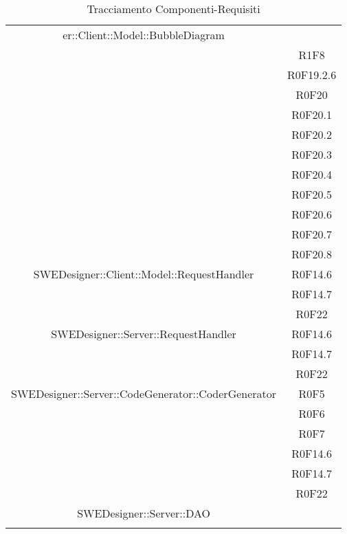 \documentclass[../SpecificaTecnica.tex]{subfiles}
\begin{document}
\begin{longtable}{|c|c|}
er::Client::Model::BubbleDiagram & \\&R1F8\\&R0F19.2.6\\&R0F20\\&R0F20.1\\&R0F20.2\\&R0F20.3\\&R0F20.4\\&R0F20.5\\&R0F20.6\\&R0F20.7\\&R0F20.8
		\\\hline
		
		SWEDesigner::Client::Model::RequestHandler & R0F14.6\\&R0F14.7\\&R0F22
		\\\hline
		
		SWEDesigner::Server::RequestHandler &  R0F14.6\\&R0F14.7\\&R0F22
		\\\hline
		
		SWEDesigner::Server::CodeGenerator::CoderGenerator & R0F5\\&R0F6\\&R0F7\\&R0F14.6\\&R0F14.7\\&R0F22
		 \\\hline
		
		SWEDesigner::Server::DAO & \\\hline
		
		

				\caption[Tracciamento Componenti-Requisiti]{Tracciamento Componenti-Requisiti}
		\label{tabella:componenti-requisiti}
	\end{longtable}
	\clearpage
\end{document}
